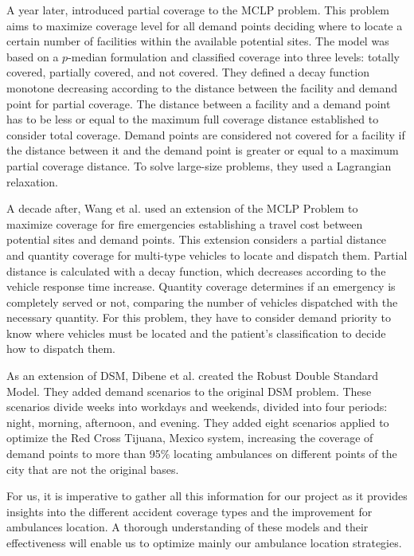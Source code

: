 A year later, \cite{karasakal2004maximal} introduced partial coverage to the MCLP problem. This problem aims to maximize coverage level for all demand points deciding where to locate a certain number of facilities within the available potential sites. The model was based on a $p$-median formulation and classified coverage into three levels: totally covered, partially covered, and not covered. They defined a decay function monotone decreasing according to the distance between the facility and demand point for partial coverage. The distance between a facility and a demand point has to be less or equal to the maximum full coverage distance established to consider total coverage. Demand points are considered not covered for a facility if the distance between it and the demand point is greater or equal to a maximum partial coverage distance. To solve large-size problems, they used a Lagrangian relaxation.

A decade after, Wang et al. \cite{wang2016new} used an extension of the MCLP Problem to maximize coverage for fire emergencies establishing a travel cost between potential sites and demand points. This extension considers a partial distance and quantity coverage for multi-type vehicles to locate and dispatch them. Partial distance is calculated with a decay function, which decreases according to the vehicle response time increase. Quantity coverage determines if an emergency is completely served or not, comparing the number of vehicles dispatched with the necessary quantity. For this problem, they have to consider demand priority to know where vehicles must be located and the patient's classification to decide how to dispatch them.

As an extension of DSM, Dibene et al. \cite{dibene2017optimizing} created the Robust Double Standard Model. They added demand scenarios to the original DSM problem. These scenarios divide weeks into workdays and weekends, divided into four periods: night, morning, afternoon, and evening. They added eight scenarios applied to optimize the Red Cross Tijuana, Mexico system, increasing the coverage of demand points to more than 95\% locating ambulances on different points of the city that are not the original bases.  

For us, it is imperative to gather all this information for our project as it provides insights into the different accident coverage types and the improvement for ambulances location. A thorough understanding of these models and their effectiveness will enable us to optimize mainly our ambulance location strategies.

